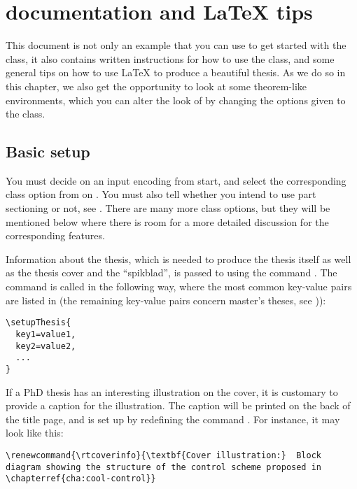 \chapter{\rtthesis documentation and \LaTeX{} tips}\label{cha:rtthesis}

This document is not only an example that you can use to get started with the \rtthesis class, it also contains written instructions for how to use the class, and some general tips on how to use \LaTeX{} to produce a beautiful thesis.  As we do so in this chapter, we also get the opportunity to look at some theorem-like environments, which you can alter the look of by changing the options given to the \rtthesis class.

\section{Basic setup}\label{sec:basic-setup}
%
You must decide on an input encoding from start, and select the corresponding class option from  on .  You must also tell \rtthesis whether you intend to use part sectioning or not, see .  There are many more class options, but they will be mentioned below where there is room for a more detailed discussion for the corresponding features.

Information about the thesis, which is needed to produce the thesis itself as well as the thesis cover and the “spikblad”, is passed to \rtthesis using the command .  The command is called in the following way, where the most common key-value pairs are listed in  (the remaining key-value pairs concern master's theses, see )):

\begin{minipage}{1.0\linewidth}
  \verbatimsize
\begin{verbatim}
\setupThesis{
  key1=value1,
  key2=value2,
  ...
}
\end{verbatim}
\end{minipage}

If a PhD thesis has an interesting illustration on the cover, it is customary to provide a caption for the illustration.  The caption will be printed on the back of the title page, and is set up by redefining the command .  For instance, it may look like this:

\begin{minipage}{1.0\linewidth}
  \verbatimsize
\begin{verbatim}
\renewcommand{\rtcoverinfo}{\textbf{Cover illustration:}  Block
diagram showing the structure of the control scheme proposed in
\chapterref{cha:cool-control}}
\end{verbatim}
\end{minipage}



